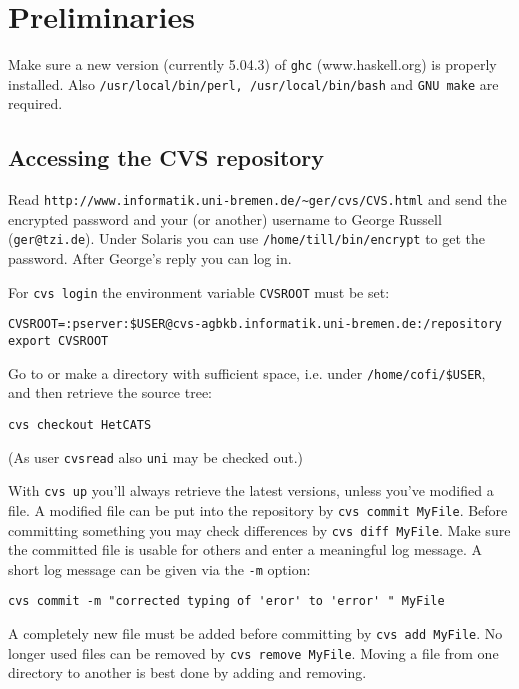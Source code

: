 \documentclass{article}
\begin{document}
\section{Preliminaries}

Make sure a new version (currently 5.04.3) of \texttt{ghc}
(www.haskell.org) is properly installed.  Also
\texttt{/usr/local/bin/perl, /usr/local/bin/bash} and \texttt{GNU
  make} are required.


\subsection{Accessing the CVS repository}

Read \texttt{http://www.informatik.uni-bremen.de/\~{}ger/cvs/CVS.html}
and send the encrypted password and your (or another) username to
George Russell (\texttt{ger@tzi.de}). Under Solaris you can use
\texttt{/home/till/bin/encrypt} to get the password. After George's
reply you can log in. 

For \texttt{cvs login} the environment variable \texttt{CVSROOT} must be set:

\begin{verbatim}
CVSROOT=:pserver:$USER@cvs-agbkb.informatik.uni-bremen.de:/repository
export CVSROOT
\end{verbatim}

Go to or make a directory with sufficient space, i.e. under
\texttt{/home/cofi/\$USER}, and then retrieve the source tree:

\begin{verbatim}
cvs checkout HetCATS
\end{verbatim}

(As user \texttt{cvsread} also \texttt{uni} may be checked out.)

With \texttt{cvs up} you'll always retrieve the latest versions,
unless you've modified a file. A modified file can be put into the
repository by \texttt{cvs commit MyFile}. Before committing something
you may check differences by \texttt{cvs diff MyFile}. Make sure the
committed file is usable for others and enter a meaningful log
message. A short log message can be given via the \texttt{-m} option:

\begin{verbatim}
cvs commit -m "corrected typing of 'eror' to 'error' " MyFile
\end{verbatim}

A completely new file must be added before committing by \texttt{cvs
  add MyFile}.  No longer used files can be removed by \texttt{cvs
  remove MyFile}.  Moving a file from one directory to another is
best done by adding and removing.
\end{document}
